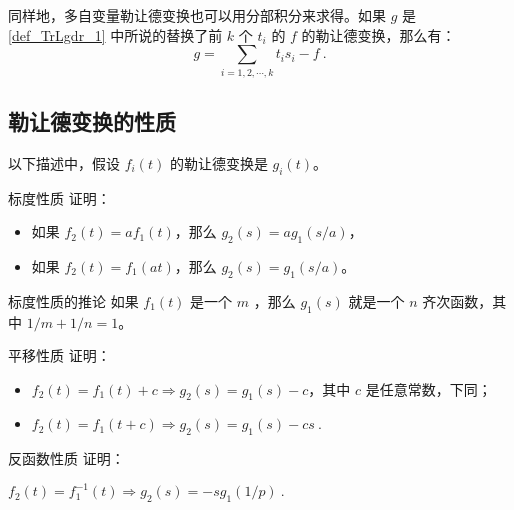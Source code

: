 同样地，多自变量勒让德变换也可以用分部积分来求得。如果 $g$ 是\autoref{def_TrLgdr_1} 中所说的替换了前 $k$ 个 $t_i$ 的 $f$ 的勒让德变换，那么有：\begin{equation}\label{eq_TrLgdr_1}
g=\sum\limits_{i=1,2,\cdots, k}t_is_i-f~.
\end{equation}

\subsection{勒让德变换的性质}

以下描述中，假设 $f_i(t)$ 的勒让德变换是 $g_i(t)$。

\begin{exercise}{标度性质}
证明：
\begin{itemize}
\item 如果 $f_2(t)=af_1(t)$，那么 $g_2(s)=ag_1(s/a)$，
\item 如果 $f_2(t)=f_1(at)$，那么 $g_2(s)=g_1(s/a)$。
\end{itemize}
\end{exercise}

\begin{corollary}{标度性质的推论}
如果 $f_1(t)$ 是一个 $m$ ，那么 $g_1(s)$ 就是一个 $n$ 齐次函数，其中 $1/m+1/n=1$。
\end{corollary}

\begin{exercise}{平移性质}
证明：
\begin{itemize}
\item $f_2(t)=f_1(t)+c\Rightarrow g_2(s)=g_1(s)-c$，其中 $c$ 是任意常数，下同；
\item $f_2(t)=f_1(t+c)\Rightarrow g_2(s)=g_1(s)-cs~.$
\end{itemize}
\end{exercise}

\begin{exercise}{反函数性质}
证明：

$f_2(t)=f_1^{-1}(t)\Rightarrow g_2(s)=-sg_1(1/p)~.$
\end{exercise}








